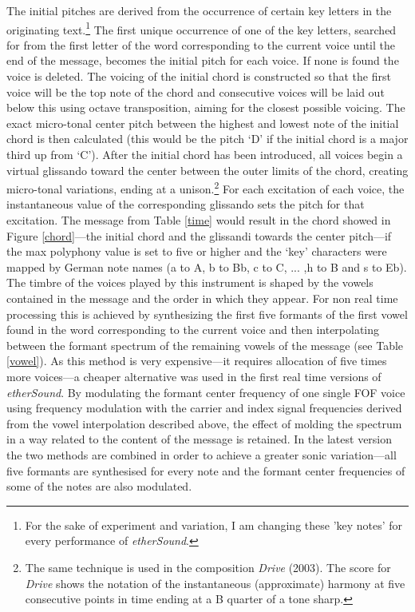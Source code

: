 The initial pitches are derived from the occurrence of certain key letters in the originating text.\footnote{For the sake of experiment   and variation, I am changing these 'key notes' for every performance   of \emph{etherSound}.} The first unique occurrence of one of the key letters, searched for from the first letter of the word corresponding to the current voice until the end of the message, becomes the initial pitch for each voice. If none is found the voice is deleted. The voicing of the initial chord is constructed so that the first voice will be the top note of the chord and consecutive voices will be laid out below this using octave transposition, aiming for the closest possible voicing. 
The exact micro-tonal center pitch between the highest and lowest note of the initial chord is then calculated (this would be the pitch `D' if the initial chord is a major third up from `C'). After the initial chord has been introduced, all voices begin a virtual glissando toward the center between the outer limits of the chord, creating micro-tonal variations, ending at a unison.\footnote{The same technique is used in   the composition \emph{Drive} (2003). The score for \emph{Drive}   shows the notation of the instantaneous (approximate) harmony at   five consecutive points in time ending at a B quarter of a tone   sharp.} For each excitation of each voice, the instantaneous value of the corresponding glissando sets the pitch for that excitation. The message from Table \ref{time} would result in the chord showed in Figure \ref{chord}---the initial chord and the glissandi towards the center pitch---if the max polyphony value is set to five or higher and the `key' characters were mapped by German note names (a to A, b to Bb, c to C, ... ,h to B and s to Eb). 
The timbre of the voices played by this instrument is shaped by the vowels contained in the message and the order in which they appear. For non real time processing this is achieved by synthesizing the first five formants of the first vowel found in the word corresponding to the current voice and then interpolating between the formant spectrum of the remaining vowels of the message (see Table \ref{vowel}). As this method is very expensive---it requires allocation of five times more voices---a cheaper alternative was used in the first real time versions of \emph{etherSound}. By modulating the formant center frequency of one single FOF voice using frequency modulation with the carrier and index signal frequencies derived from the vowel interpolation described above, the effect of molding the spectrum in a way related to the content of the message is retained. In the latest version the two methods are combined in order to achieve a greater sonic variation---all five formants are synthesised for every note and the formant center frequencies of some of the notes are also modulated. 
